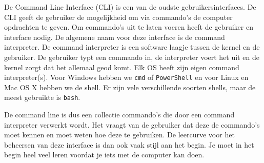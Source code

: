 De Command Line Interface (CLI) is een van de oudste gebruikersinterfaces. De CLI geeft de gebruiker de mogelijkheid om via commando's de computer opdrachten te geven. Om commando's uit te laten voeren heeft de gebruiker en interface nodig. De algemene naam voor deze interface is de command interpreter. De command interpreter is een software laagje tussen de kernel en de gebruiker. De gebruiker typt een commando in, de interpreter voert het uit en de kernel zorgt dat het allemaal geod komt. Elk OS heeft zijn eigen command interpreter(s). Voor Windows hebben we \texttt{cmd} of \texttt{PowerShell} en voor Linux en Mac OS X hebben we de shell. Er zijn vele verschillende soorten shells, maar de meest gebruikte is \texttt{bash}.

De command line is dus een collectie commando's die door een command interpreter verwerkt wordt. Het vraagt van de gebruiker dat deze de commando's moet kennen en moet weten hoe deze te gebruiken. De leercurve voor het beheersen van deze interface is dan ook vaak stijl aan het begin. Je moet in het begin heel veel leren voordat je iets met de computer kan doen.

